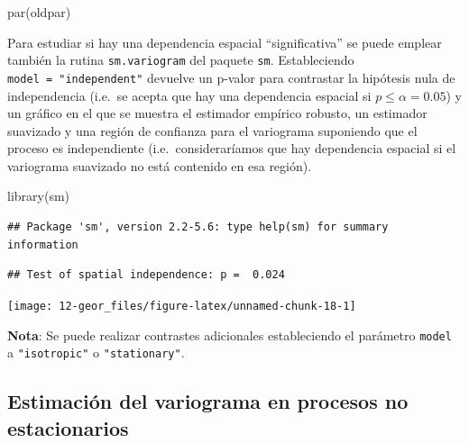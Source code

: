 \documentclass[
  spanish,
]{book}
\newenvironment{Shaded}{\begin{snugshade}}{\end{snugshade}}
\newcommand{\AttributeTok}[1]{\textcolor[rgb]{0.77,0.63,0.00}{#1}}
\newcommand{\FunctionTok}[1]{\textcolor[rgb]{0.00,0.00,0.00}{#1}}
\newcommand{\NormalTok}[1]{#1}
\newcommand{\SpecialCharTok}[1]{\textcolor[rgb]{0.00,0.00,0.00}{#1}}
\newcommand{\StringTok}[1]{\textcolor[rgb]{0.31,0.60,0.02}{#1}}
\theoremstyle{break}
\begin{document}
\begin{Shaded}
\begin{Highlighting}[]
\FunctionTok{par}\NormalTok{(oldpar)     }
\end{Highlighting}
\end{Shaded}

Para estudiar si hay una dependencia espacial ``significativa'' se puede
emplear también la rutina \texttt{sm.variogram} del paquete \texttt{sm}.
Estableciendo \texttt{model\ =\ "independent"}
devuelve un p-valor para contrastar la hipótesis nula de independencia
(i.e.~se acepta que hay una dependencia espacial si \(p \leq \alpha = 0.05\))
y un gráfico en el que se muestra el estimador empírico robusto, un estimador
suavizado y una región de confianza para el variograma suponiendo que el
proceso es independiente (i.e.~consideraríamos que hay dependencia
espacial si el variograma suavizado no está contenido en esa región).

\begin{Shaded}
\begin{Highlighting}[]
\FunctionTok{library}\NormalTok{(sm)}
\end{Highlighting}
\end{Shaded}

\begin{verbatim}
## Package 'sm', version 2.2-5.6: type help(sm) for summary information
\end{verbatim}

\begin{Shaded}
\end{Shaded}

\begin{verbatim}
## Test of spatial independence: p =  0.024
\end{verbatim}

\begin{center}\texttt{[image: 12-geor\_files/figure-latex/unnamed-chunk-18-1]} \end{center}

\textbf{Nota}: Se puede realizar contrastes adicionales estableciendo el parámetro \texttt{model}
a \texttt{"isotropic"} o \texttt{"stationary"}.

\hypertarget{estimaciuxf3n-del-variograma-en-procesos-no-estacionarios}{%
\subsection{Estimación del variograma en procesos no estacionarios}\label{estimaciuxf3n-del-variograma-en-procesos-no-estacionarios}}
\end{document}
